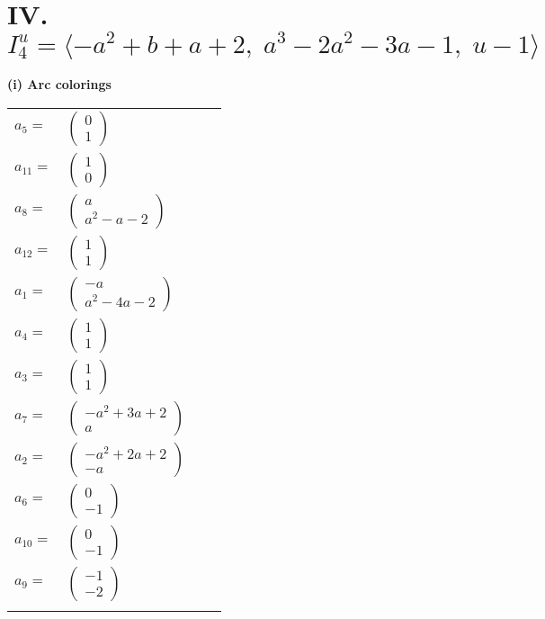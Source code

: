 \documentclass[1p]{elsarticle_modified}
\theoremstyle{definition}
\begin{document}
\centering \section*{IV. $I^u_{4}= \langle - a^2+b+a+2,\;a^3-2 a^2-3 a-1,\;u-1 \rangle$}
\flushleft \textbf{(i) Arc colorings}\\
\begin{tabular}{m{7pt} m{180pt} m{7pt} m{180pt} }
\flushright $a_{5}=$&$\begin{pmatrix}0\\1\end{pmatrix}$ \\
\flushright $a_{11}=$&$\begin{pmatrix}1\\0\end{pmatrix}$ \\
\flushright $a_{8}=$&$\begin{pmatrix}a\\a^2- a-2\end{pmatrix}$ \\
\flushright $a_{12}=$&$\begin{pmatrix}1\\1\end{pmatrix}$ \\
\flushright $a_{1}=$&$\begin{pmatrix}- a\\a^2-4 a-2\end{pmatrix}$ \\
\flushright $a_{4}=$&$\begin{pmatrix}1\\1\end{pmatrix}$ \\
\flushright $a_{3}=$&$\begin{pmatrix}1\\1\end{pmatrix}$ \\
\flushright $a_{7}=$&$\begin{pmatrix}- a^2+3 a+2\\a\end{pmatrix}$ \\
\flushright $a_{2}=$&$\begin{pmatrix}- a^2+2 a+2\\- a\end{pmatrix}$ \\
\flushright $a_{6}=$&$\begin{pmatrix}0\\-1\end{pmatrix}$ \\
\flushright $a_{10}=$&$\begin{pmatrix}0\\-1\end{pmatrix}$ \\
\flushright $a_{9}=$&$\begin{pmatrix}-1\\-2\end{pmatrix}$\\&\end{tabular}
\end{document}
